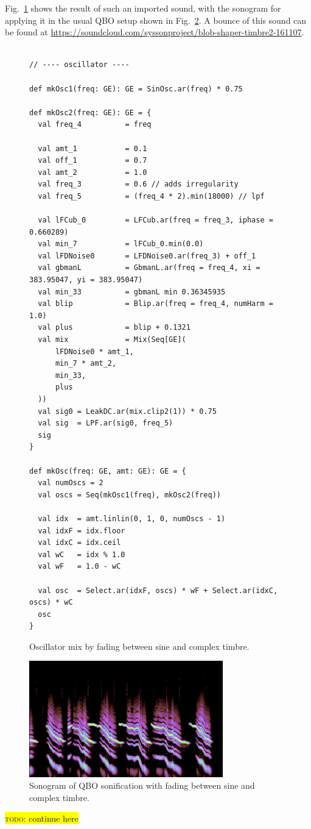 \documentclass[11pt,a4paper]{article}
\newcommand{\todo}[1]{\colorbox{yellow}{\textsc{todo}: #1}}
\newcommand{\figref}[1]{Fig.~\ref{#1}}
\begin{document}
\figref{fig:code-shaper-timbre2} shows the result of such an imported sound, with the sonogram for applying it in the usual QBO setup shown in \figref{fig:sono-shaper-timbre2}. A bounce of this sound can be found at \url{https://soundcloud.com/syssonproject/blob-shaper-timbre2-161107}.

\begin{figure}[b]
\begin{lstlisting}[style=scala]

// ---- oscillator ----

def mkOsc1(freq: GE): GE = SinOsc.ar(freq) * 0.75

def mkOsc2(freq: GE): GE = {
  val freq_4          = freq
  
  val amt_1           = 0.1
  val off_1           = 0.7
  val amt_2           = 1.0
  val freq_3          = 0.6 // adds irregularity
  val freq_5          = (freq_4 * 2).min(18000) // lpf
  
  val lFCub_0         = LFCub.ar(freq = freq_3, iphase = 0.660289)
  val min_7           = lFCub_0.min(0.0)
  val lFDNoise0       = LFDNoise0.ar(freq_3) + off_1
  val gbmanL          = GbmanL.ar(freq = freq_4, xi = 383.95047, yi = 383.95047)
  val min_33          = gbmanL min 0.36345935
  val blip            = Blip.ar(freq = freq_4, numHarm = 1.0)
  val plus            = blip + 0.1321
  val mix             = Mix(Seq[GE](
      lFDNoise0 * amt_1, 
      min_7 * amt_2, 
      min_33, 
      plus
  ))
  val sig0 = LeakDC.ar(mix.clip2(1)) * 0.75
  val sig  = LPF.ar(sig0, freq_5)
  sig
}

def mkOsc(freq: GE, amt: GE): GE = {
  val numOscs = 2
  val oscs = Seq(mkOsc1(freq), mkOsc2(freq))
  
  val idx  = amt.linlin(0, 1, 0, numOscs - 1)
  val idxF = idx.floor
  val idxC = idx.ceil
  val wC   = idx % 1.0
  val wF   = 1.0 - wC
  
  val osc  = Select.ar(idxF, oscs) * wF + Select.ar(idxC, oscs) * wC
  osc
}
\end{lstlisting}
\caption{Oscillator mix by fading between sine and complex timbre.}
\label{fig:code-shaper-timbre2}
\end{figure}

\begin{figure}
\centering
\includegraphics[width=0.75\textwidth]{figures/blob-shaper-timbre2-161106.png}
\caption{Sonogram of QBO sonification with fading between sine and complex timbre.}
\label{fig:sono-shaper-timbre2}
\end{figure}

\todo{continue here}

\end{document}
